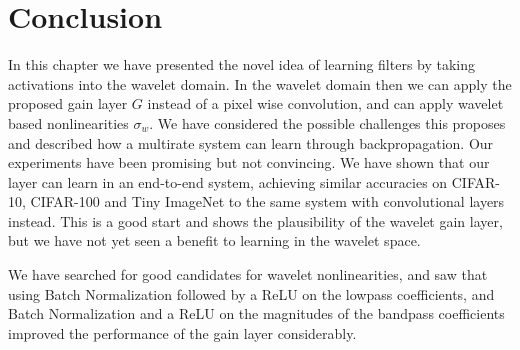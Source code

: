 \section{Conclusion}
In this chapter we have presented the novel idea of learning filters by taking
activations into the wavelet domain. In the wavelet domain then we can apply
the proposed gain layer $G$ instead of a pixel wise convolution, and can apply
wavelet based nonlinearities $\sigma_w$. We have considered the possible
challenges this proposes and described how a multirate system can learn through
backpropagation. 
Our experiments have been promising but not convincing. We have shown that our layer can learn in an
end-to-end system, achieving similar accuracies on CIFAR-10, CIFAR-100 and Tiny
ImageNet to the same system with convolutional layers instead. This is a good
start and shows the plausibility of the wavelet gain layer, but we have not yet
seen a benefit to learning in the wavelet space. 

We have searched for good candidates for wavelet nonlinearities, and saw that
using Batch Normalization followed by a ReLU on the lowpass coefficients, and
Batch Normalization and a ReLU on the magnitudes of the bandpass coefficients
improved the performance of the gain layer considerably.
